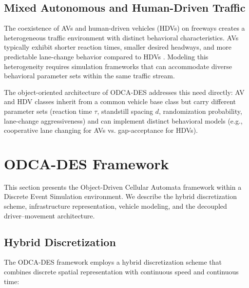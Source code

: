 \documentclass[review,authoryear]{elsarticle}
\begin{document}
\subsection{Mixed Autonomous and Human-Driven Traffic}
\label{sec:lit_mixed}

The coexistence of AVs and human-driven vehicles (HDVs) on freeways creates a heterogeneous traffic environment with distinct behavioral characteristics. AVs typically exhibit shorter reaction times, smaller desired headways, and more predictable lane-change behavior compared to HDVs \citep{talebpour2016influence, shladover2012impacts, vanarem2006effects}. Modeling this heterogeneity requires simulation frameworks that can accommodate diverse behavioral parameter sets within the same traffic stream.

The object-oriented architecture of ODCA-DES addresses this need directly: AV and HDV classes inherit from a common vehicle base class but carry different parameter sets (reaction time $\tau$, standstill spacing $d$, randomization probability, lane-change aggressiveness) and can implement distinct behavioral models (e.g., cooperative lane changing for AVs vs. gap-acceptance for HDVs).


\section{ODCA-DES Framework}
\label{sec:framework}

This section presents the Object-Driven Cellular Automata framework within a Discrete Event Simulation environment. We describe the hybrid discretization scheme, infrastructure representation, vehicle modeling, and the decoupled driver--movement architecture.

\subsection{Hybrid Discretization}
\label{sec:discretization}

The ODCA-DES framework employs a hybrid discretization scheme that combines discrete spatial representation with continuous speed and continuous time:
\end{document}
